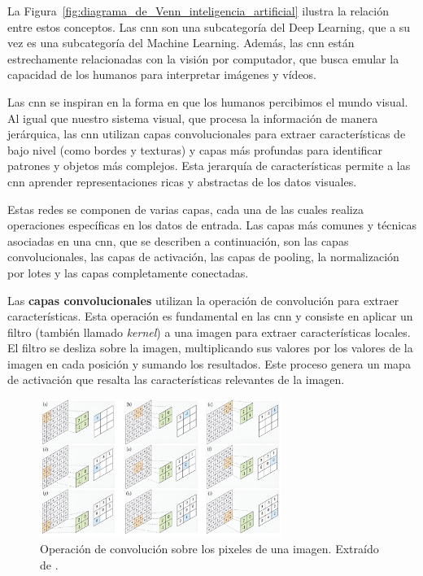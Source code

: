 \documentclass[11pt,spanish,listoffigures,listoftables]{tfgetsinf}
\begin{document}
La Figura~\ref{fig:diagrama_de_Venn_inteligencia_artificial} ilustra la relación entre estos conceptos. Las \gls{cnn} son una subcategoría del Deep Learning, que a su vez es una subcategoría del Machine Learning. Además, las \gls{cnn} están estrechamente relacionadas con la visión por computador, que busca emular la capacidad de los humanos para interpretar imágenes y vídeos.

Las \gls{cnn} se inspiran en la forma en que los humanos percibimos el mundo visual. Al igual que nuestro sistema visual, que procesa la información de manera jerárquica, las \gls{cnn} utilizan capas convolucionales para extraer características de bajo nivel (como bordes y texturas) y capas más profundas para identificar patrones y objetos más complejos. Esta jerarquía de características permite a las \gls{cnn} aprender representaciones ricas y abstractas de los datos visuales.

Estas redes se componen de varias capas, cada una de las cuales realiza operaciones específicas en los datos de entrada. Las capas más comunes y técnicas asociadas en una \gls{cnn}, que se describen a continuación, son las capas convolucionales, las capas de activación, las capas de pooling, la normalización por lotes y las capas completamente conectadas.

Las \textbf{capas convolucionales} utilizan la operación de convolución para extraer características. Esta operación es fundamental en las \gls{cnn} y consiste en aplicar un filtro (también llamado \textit{kernel}) a una imagen para extraer características locales. El filtro se desliza sobre la imagen, multiplicando sus valores por los valores de la imagen en cada posición y sumando los resultados. Este proceso genera un mapa de activación que resalta las características relevantes de la imagen.

\begin{figure}[H]
   \centering
   \includegraphics[width=0.7\textwidth]{images/estado_del_arte/operacion_convolucion.png}
   \caption[Operación de convolución sobre los pixeles de una imagen]{Operación de convolución sobre los pixeles de una imagen. Extraído de \cite[fig. 2.5, p. ~48]{khan2018guide}.}
   \label{fig:operacion_convolucion}
\end{figure}
\end{document}
